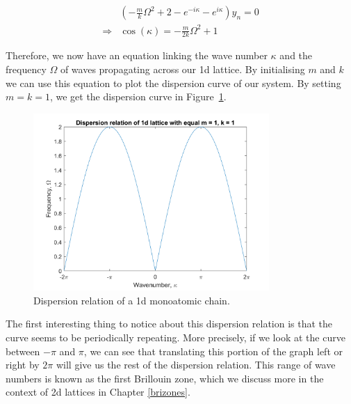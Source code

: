 \begin{align}
  &\left(-\frac{m}{k}\Omega^{2}+2-e^{-i\kappa}-e^{i\kappa}\right)y_{n}=0 \\
  \Rightarrow &\cos\left(\kappa\right)=-\frac{m}{2k}\Omega^{2}+1
\end{align}

Therefore, we now have an equation linking the wave number $\kappa$ and the
frequency $\Omega$ of waves propagating across our 1d lattice. By initialising
$m$ and $k$ we can use this equation to plot the dispersion curve of our
system. By setting $m=k=1$, we get the dispersion curve in
Figure~\ref{fig:dc1}.

\begin{figure}[!h]
\centering
\includegraphics[width=0.8\textwidth]{imgs/1ddispersion.png}
\caption{\label{fig:dc1}Dispersion relation of a 1d monoatomic
         chain.}
\end{figure}

The first interesting thing to notice about this dispersion relation is that
the curve seems to be periodically repeating. More precisely, if we look at the
curve between $-\pi$ and $\pi$, we can see that translating this portion of the
graph left or right by $2\pi$ will give us the rest of the dispersion relation.
This range of wave numbers is known as the first Brillouin zone, which we
discuss more in the context of 2d lattices in Chapter \ref{brizones}.

